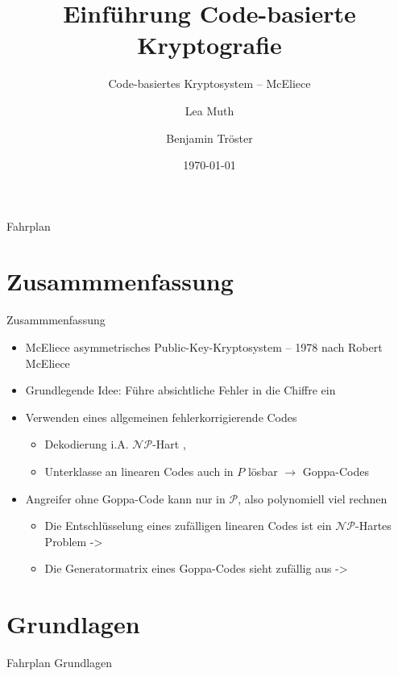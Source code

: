 \documentclass[11pt%
,aspectratio=169%
]{beamer}
\author{Lea Muth \and Benjamin Tröster}
\title[Code-basierte Kryptografie]{Einführung Code-basierte Kryptografie}
\subtitle{Code-basiertes Kryptosystem -- McEliece}
\date{\today}
\institute[FU Berlin]{Freie Universität Berlin}
\begin{document}
\begin{frame}
\titlepage
\end{frame}

\begin{frame}{Fahrplan}
\tableofcontents[hideothersubsections]
\end{frame}

\section*{Zusammmenfassung}
\begin{frame}{Zusammmenfassung}
	\begin{itemize}
		\item McEliece asymmetrisches Public-Key-Kryptosystem -- 1978 nach Robert McEliece \cite{McEliece1978public}
		\item Grundlegende Idee: Führe absichtliche Fehler in die Chiffre ein 
		\item Verwenden eines allgemeinen fehlerkorrigierende Codes
		\begin{itemize}
		    \item Dekodierung i.A. $\mathcal{NP}$-Hart \cite[S. 479]{Schneier2007Applied}, \cite[S. 353ff]{Stinson2018Cryptography}
		    \item Unterklasse an linearen Codes auch in $P$ lösbar $\rightarrow$ Goppa-Codes
		\end{itemize}
		\item Angreifer ohne Goppa-Code kann nur in $\mathcal{P}$, also polynomiell viel rechnen
		\begin{itemize}
		    \item Die Entschlüsselung eines zufälligen linearen Codes ist ein $\mathcal{NP}$-Hartes Problem -> \cite{ljubic2004exact}
		    \item Die Generatormatrix eines Goppa-Codes sieht zufällig aus ->  \cite{6553164} 
		\end{itemize}
	\end{itemize}
\end{frame}

\section{Grundlagen}

\begin{frame}{Fahrplan Grundlagen}
\end{frame}
\end{document}
